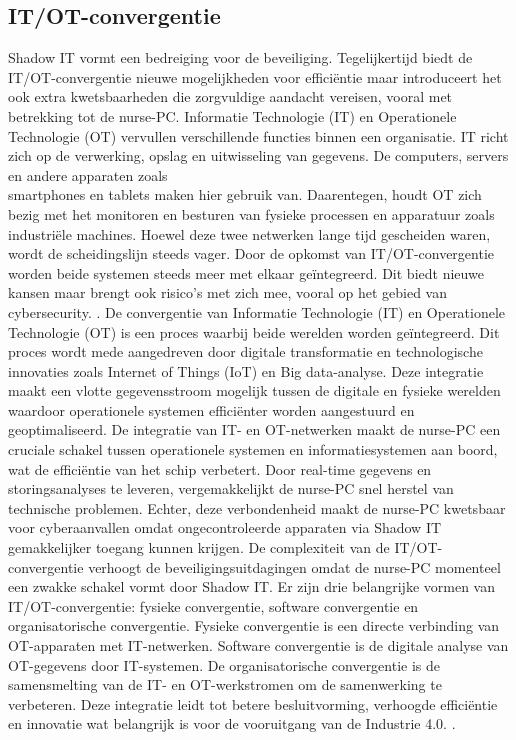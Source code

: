 \subsection{IT/OT-convergentie}
Shadow IT vormt een bedreiging voor de beveiliging. 
Tegelijkertijd biedt de IT/OT-convergentie nieuwe mogelijkheden voor efficiëntie maar introduceert het ook extra kwetsbaarheden die zorgvuldige aandacht vereisen, 
vooral met betrekking tot de nurse-PC.
Informatie Technologie (IT) en Operationele \\Technologie (OT) vervullen verschillende functies binnen een organisatie. IT richt zich op de verwerking, opslag en 
uitwisseling van gegevens. De computers, servers en andere apparaten zoals \\smartphones en tablets maken hier gebruik van. Daarentegen, houdt OT zich bezig met het 
monitoren en besturen van fysieke processen en apparatuur zoals industriële machines. Hoewel deze twee netwerken lange tijd gescheiden waren, 
\\wordt de scheidingslijn steeds vager. Door de opkomst van IT/OT-convergentie worden beide systemen steeds meer met elkaar geïntegreerd. Dit biedt nieuwe kansen
maar brengt ook risico’s met zich mee, vooral op het gebied van cybersecurity. \autocite{onlogic2023}.
De convergentie van Informatie Technologie (IT) en Operationele Technologie (OT) is een proces waarbij beide werelden worden geïntegreerd. 
Dit proces wordt mede aangedreven door digitale transformatie en technologische innovaties zoals Internet of Things (IoT) en Big data-analyse. 
Deze integratie maakt een vlotte gegevensstroom mogelijk tussen de digitale en fysieke werelden
waardoor operationele systemen efficiënter worden aangestuurd en geoptimaliseerd. 
De integratie van IT- en OT-netwerken maakt de nurse-PC een cruciale schakel tussen operationele systemen en informatiesystemen aan boord, 
wat de efficiëntie van het schip verbetert. Door real-time gegevens en storingsanalyses te leveren, vergemakkelijkt de nurse-PC snel herstel van technische problemen. 
Echter, deze verbondenheid maakt de nurse-PC kwetsbaar voor cyberaanvallen omdat ongecontroleerde apparaten via Shadow IT gemakkelijker toegang kunnen krijgen. 
De complexiteit van de IT/OT-convergentie verhoogt de beveiligingsuitdagingen omdat de nurse-PC momenteel een zwakke schakel vormt door Shadow IT.
Er zijn drie belangrijke vormen van IT/OT-convergentie: fysieke convergentie, software convergentie en organisatorische convergentie. 
Fysieke convergentie is een directe verbinding van OT-apparaten met IT-netwerken. Software convergentie is
de digitale analyse van OT-gegevens door IT-systemen. De organisatorische convergentie is de samensmelting van de IT- en OT-werkstromen om de samenwerking te verbeteren.
Deze integratie leidt tot betere besluitvorming, verhoogde efficiëntie en innovatie wat belangrijk is voor de vooruitgang van de Industrie 4.0. \autocite{maleh2021ot,paloaltonetworks2023}.


